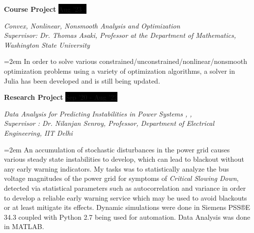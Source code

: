 \documentclass[paper=a4,fontsize=11pt]{scrartcl} %
\newcommand{\sepspace}{\vspace*{1em}}		%
\newcommand{\NewPart}[1]{\section*{\uppercase{#1}}}
\newcommand{\EducationEntry}[4]{
		\noindent \textbf{#1} \hfill      %
		\colorbox{Black}{%
			\parbox{10em}{%
			\hfill\color{White}#2}} \par  %
		\noindent \textit{#3} \par        %
		\noindent\hangindent=2em\hangafter=0 \small #4 %
		\normalsize \par}
\newcommand{\WorkEntry}[4]{				  %
		\noindent \textbf{#1} \hfill      %
		\colorbox{Black}{\color{White}#2} \par  %
		\noindent \textit{#3} \par              %
		\noindent\hangindent=2em\hangafter=0 \small #4 %
		\normalsize \par}
\begin{document}
\sepspace

\WorkEntry{Course Project}{Aug '23 - }{Convex, Nonlinear, Nonsmooth Analysis and Optimization \href{https://github.com/Realife-Brahmin/WSU-Convex-Nonlinear-Nonsmooth-Analysis-and-Optimization}{\textcolor{juliapurple}{\faGithub}} \\ Supervisor: Dr. Thomas Asaki, Professor at the Department of Mathematics, Washington State University}{In order to solve various constrained/unconstrained/nonlinear/nonsmooth optimization problems using a variety of optimization algorithms, a solver in Julia has been developed and is still being updated.}

\sepspace

\WorkEntry{Research Project}{Sep '20 - Aug '22}{Data Analysis for Predicting Instabilities in Power Systems \href{https://github.com/Realife-Brahmin/eld895_simulation_psse}{\textcolor{pythonblue}{\faGithub}}, \href{https://github.com/Realife-Brahmin/eld895_analysis_simulated_grids}{\textcolor{matlaborange}{\faGithub}}, \href{https://github.com/Realife-Brahmin/eld895_analysis_real_grids}{\textcolor{matlaborange}{\faGithub}}\\ Supervisor : Dr. Nilanjan Senroy, Professor, Department of Electrical Engineering, IIT Delhi}{An accumulation of stochastic disturbances in the power grid causes various steady state instabilities to develop, which can lead to blackout without any early warning indicators. My tasks was to statistically analyze the bus voltage magnitudes of the power grid for symptoms of \textit{Critical Slowing Down}, detected via statistical parameters such as autocorrelation and variance in order to develop a reliable early warning service which may be used to avoid blackouts or at least mitigate its effects. Dynamic simulations were done in Siemens PSS®E 34.3 coupled with Python 2.7 being used for automation. Data Analysis was done in MATLAB.}


\end{document}
